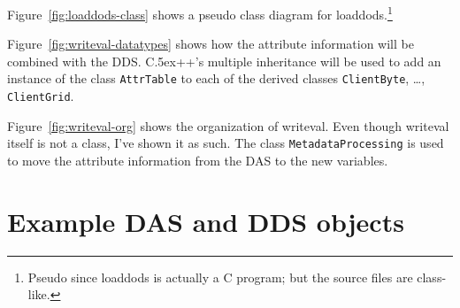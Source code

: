 \documentclass{article}
\newcommand{\Cpp}{\rm {\small C}\raise.5ex\hbox{\footnotesize ++}\xspace}
\begin{document}
Figure~\ref{fig:loaddods-class} shows a pseudo class diagram for
loaddods.\footnote{Pseudo since loaddods is actually a C program; but the
  source files are class-like.} 

\begin{sidewaysfigure}
\begin{center}
\caption{UML class diagram for loaddods. The writeval program is shown as a
  class.}
\label{fig:loaddods-class}
\end{center}
\end{sidewaysfigure}

Figure~\ref{fig:writeval-datatypes} shows how the attribute information will
be combined with the DDS. \Cpp's multiple inheritance will be used to add an
instance of the class \texttt{AttrTable} to each of the derived classes
\texttt{ClientByte}, \ldots, \texttt{ClientGrid}. 

\begin{sidewaysfigure}
\begin{center}
\caption{UML Diagram for the structure of \texttt{writeval}'s datatype
  organization. The classes \texttt{ClientByte}, etc., will inherit from both
  \texttt{Byte}, etc., and \texttt{AttrTable}. Other software will transfer
  attribute information from the DODS server's DAS object to the new
  `amplified' variables.}
\label{fig:writeval-datatypes}
\end{center}
\end{sidewaysfigure}

Figure~\ref{fig:writeval-org} shows the organization of writeval. Even though
writeval itself is not a class, I've shown it as such. The class
\texttt{MetadataProcessing} is used to move the attribute information from
the DAS to the new variables.

\begin{sidewaysfigure}
\begin{center}
\caption{UML Diagram for \texttt{writeval}. The class
  \texttt{MetadataProcessing} handles moving DAS information into variables.}
\label{fig:writeval-org}
\end{center}
\end{sidewaysfigure}

\clearpage
\appendix

\section{Example DAS and DDS objects}
\label{app:dds-das}
\end{document}
